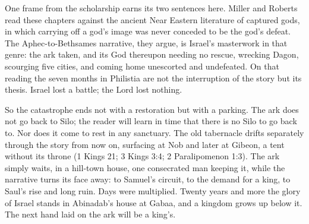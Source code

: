 One frame from the scholarship earns its two sentences here. Miller and
Roberts read these chapters against the ancient Near Eastern literature of
captured gods, in which carrying off a god's image was never conceded to be
the god's defeat. The Aphec-to-Bethsames narrative, they argue, is Israel's
masterwork in that genre: the ark taken, and its God thereupon needing no
rescue, wrecking Dagon, scourging five cities, and coming home unescorted
and undefeated. On that reading the seven months in Philistia are
not the interruption of the story but its thesis. Israel lost a battle; the
Lord lost nothing.

So the catastrophe ends not with a restoration but with a parking. The ark
does not go back to Silo; the reader will learn in time that there is no
Silo to go back to. Nor does it come to rest in any sanctuary. The old
tabernacle drifts separately through the story from now on, surfacing at
Nob and later at Gibeon, a tent without its throne (1 Kings 21; 3 Kings
3:4; 2 Paralipomenon 1:3). The ark simply waits, in a hill-town house, one
consecrated man keeping it, while the narrative turns its face away: to
Samuel's circuit, to the demand for a king, to Saul's rise and long ruin.
Days were multiplied. Twenty years and more the glory of Israel stands in
Abinadab's house at Gabaa, and a kingdom grows up below it. The next hand
laid on the ark will be a king's.
